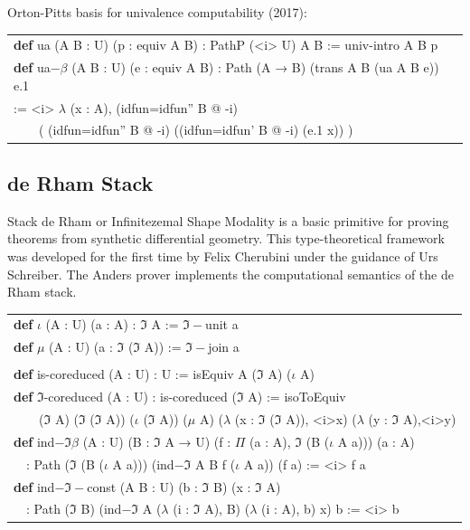 \documentclass[a4paper,UKenglish,cleveref, autoref, thm-restate]{lipics-v2021}
\newcommand{\tabstyle}[0]{\scriptsize\ttfamily\fontseries{l}\selectfont}
\begin{document}
Orton-Pitts basis for univalence computability (2017):

\begin{table}[ht!]
\tabstyle
\begin{tabular}{l}
\textbf{def} ua (A B : U) (p : equiv A B) : PathP (<i> U) A B := univ-intro A B p \\
\textbf{def} ua$-\beta$ (A B : U) (e : equiv A B) : Path (A → B) (trans A B (ua A B e)) e.1 \\
 := <i> $\lambda$ (x : A), (idfun=idfun'' B @ -i) \\
\ \ \ \ ( (idfun=idfun'' B @ -i) ((idfun=idfun' B @ -i) (e.1 x)) ) \\
\end{tabular}
\end{table}

\newpage
\subsection{de Rham Stack}

Stack de Rham or Infinitezemal Shape Modality is a basic primitive for proving theorems
from synthetic differential geometry. This type-theoretical framework was developed
for the first time by Felix Cherubini under the guidance of Urs Schreiber. The Anders
prover implements the computational semantics of the de Rham stack.

\begin{table}[ht!]
\tabstyle
\begin{tabular}{l}
\textbf{def} $\iota$ (A : U) (a : A) : $\Im$ A := $\Im-$unit a \\
\textbf{def} $\mu$ (A : U) (a : $\Im$ ($\Im$ A)) := $\Im-$join a \\
\\
\textbf{def} is-coreduced (A : U) : U := isEquiv A ($\Im$ A) ($\iota$ A) \\
\textbf{def} $\Im$-coreduced (A : U) : is-coreduced ($\Im$ A) := isoToEquiv \\
\ \ \ \ ($\Im$ A) ($\Im$ ($\Im$ A)) ($\iota$ ($\Im$ A)) ($\mu$ A) ($\lambda$ (x : $\Im$ ($\Im$ A)), <i>x) ($\lambda$ (y : $\Im$ A),<i>y) \\
\textbf{def} ind$-\Im\beta$ (A : U) (B : $\Im$ A → U) (f : $\Pi$ (a : A), $\Im$ (B ($\iota$ A a))) (a : A) \\
\ \ : Path ($\Im$ (B ($\iota$ A a))) (ind$-\Im$ A B f ($\iota$ A a)) (f a) := <i> f a \\
\textbf{def} ind$-\Im-$const (A B : U) (b : $\Im$ B) (x : $\Im$ A) \\
\ \ : Path ($\Im$ B) (ind$-\Im$ A ($\lambda$ (i : $\Im$ A), B) ($\lambda$ (i : A), b) x) b := <i> b \\
\end{tabular}
\end{table}
\end{document}
